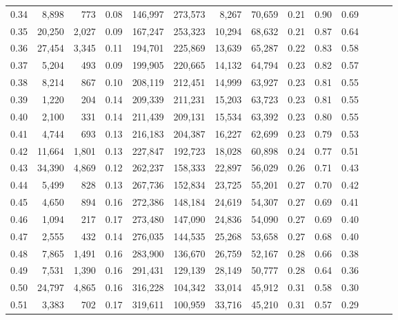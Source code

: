 \begin{tabular}{rrrrrrrrrrrrrr}
0.34 &   8,898 &    773 &  0.08 &  146,997 &  273,573 &   8,267 &  70,659 &  0.21 &  0.90 &      0.69 \\
0.35 &  20,250 &  2,027 &  0.09 &  167,247 &  253,323 &  10,294 &  68,632 &  0.21 &  0.87 &      0.64 \\
0.36 &  27,454 &  3,345 &  0.11 &  194,701 &  225,869 &  13,639 &  65,287 &  0.22 &  0.83 &      0.58 \\
0.37 &   5,204 &    493 &  0.09 &  199,905 &  220,665 &  14,132 &  64,794 &  0.23 &  0.82 &      0.57 \\
0.38 &   8,214 &    867 &  0.10 &  208,119 &  212,451 &  14,999 &  63,927 &  0.23 &  0.81 &      0.55 \\
0.39 &   1,220 &    204 &  0.14 &  209,339 &  211,231 &  15,203 &  63,723 &  0.23 &  0.81 &      0.55 \\
0.40 &   2,100 &    331 &  0.14 &  211,439 &  209,131 &  15,534 &  63,392 &  0.23 &  0.80 &      0.55 \\
0.41 &   4,744 &    693 &  0.13 &  216,183 &  204,387 &  16,227 &  62,699 &  0.23 &  0.79 &      0.53 \\
0.42 &  11,664 &  1,801 &  0.13 &  227,847 &  192,723 &  18,028 &  60,898 &  0.24 &  0.77 &      0.51 \\
0.43 &  34,390 &  4,869 &  0.12 &  262,237 &  158,333 &  22,897 &  56,029 &  0.26 &  0.71 &      0.43 \\
0.44 &   5,499 &    828 &  0.13 &  267,736 &  152,834 &  23,725 &  55,201 &  0.27 &  0.70 &      0.42 \\
0.45 &   4,650 &    894 &  0.16 &  272,386 &  148,184 &  24,619 &  54,307 &  0.27 &  0.69 &      0.41 \\
0.46 &   1,094 &    217 &  0.17 &  273,480 &  147,090 &  24,836 &  54,090 &  0.27 &  0.69 &      0.40 \\
0.47 &   2,555 &    432 &  0.14 &  276,035 &  144,535 &  25,268 &  53,658 &  0.27 &  0.68 &      0.40 \\
0.48 &   7,865 &  1,491 &  0.16 &  283,900 &  136,670 &  26,759 &  52,167 &  0.28 &  0.66 &      0.38 \\
0.49 &   7,531 &  1,390 &  0.16 &  291,431 &  129,139 &  28,149 &  50,777 &  0.28 &  0.64 &      0.36 \\
0.50 &  24,797 &  4,865 &  0.16 &  316,228 &  104,342 &  33,014 &  45,912 &  0.31 &  0.58 &      0.30 \\
0.51 &   3,383 &    702 &  0.17 &  319,611 &  100,959 &  33,716 &  45,210 &  0.31 &  0.57 &      0.29 \\

\end{tabular}
